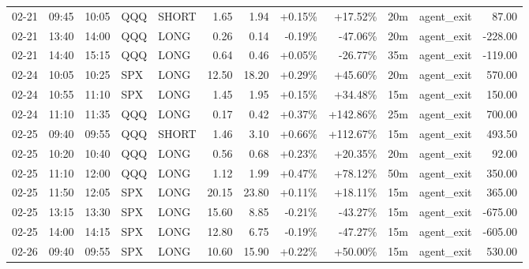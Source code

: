 \documentclass[11pt,a4paper]{article}
\begin{document}
\begin{center}
\begin{longtable}{>{\color{txtmain}}l l l l l r r r r r >{\color{txtmain}}l r}
02-21 & 09:45 & 10:05 & QQQ & SHORT & 1.65 & 1.94 & \textcolor{wingreen}{+0.15\%} & \textcolor{wingreen}{+17.52\%} & 20m & agent\_exit & \textcolor{wingreen}{87.00} \\
02-21 & 13:40 & 14:00 & QQQ & LONG & 0.26 & 0.14 & \textcolor{lossred}{-0.19\%} & \textcolor{lossred}{-47.06\%} & 20m & agent\_exit & \textcolor{lossred}{-228.00} \\
02-21 & 14:40 & 15:15 & QQQ & LONG & 0.64 & 0.46 & \textcolor{wingreen}{+0.05\%} & \textcolor{lossred}{-26.77\%} & 35m & agent\_exit & \textcolor{lossred}{-119.00} \\
02-24 & 10:05 & 10:25 & SPX & LONG & 12.50 & 18.20 & \textcolor{wingreen}{+0.29\%} & \textcolor{wingreen}{+45.60\%} & 20m & agent\_exit & \textcolor{wingreen}{570.00} \\
02-24 & 10:55 & 11:10 & SPX & LONG & 1.45 & 1.95 & \textcolor{wingreen}{+0.15\%} & \textcolor{wingreen}{+34.48\%} & 15m & agent\_exit & \textcolor{wingreen}{150.00} \\
02-24 & 11:10 & 11:35 & QQQ & LONG & 0.17 & 0.42 & \textcolor{wingreen}{+0.37\%} & \textcolor{wingreen}{+142.86\%} & 25m & agent\_exit & \textcolor{wingreen}{700.00} \\
02-25 & 09:40 & 09:55 & QQQ & SHORT & 1.46 & 3.10 & \textcolor{wingreen}{+0.66\%} & \textcolor{wingreen}{+112.67\%} & 15m & agent\_exit & \textcolor{wingreen}{493.50} \\
02-25 & 10:20 & 10:40 & QQQ & LONG & 0.56 & 0.68 & \textcolor{wingreen}{+0.23\%} & \textcolor{wingreen}{+20.35\%} & 20m & agent\_exit & \textcolor{wingreen}{92.00} \\
02-25 & 11:10 & 12:00 & QQQ & LONG & 1.12 & 1.99 & \textcolor{wingreen}{+0.47\%} & \textcolor{wingreen}{+78.12\%} & 50m & agent\_exit & \textcolor{wingreen}{350.00} \\
02-25 & 11:50 & 12:05 & SPX & LONG & 20.15 & 23.80 & \textcolor{wingreen}{+0.11\%} & \textcolor{wingreen}{+18.11\%} & 15m & agent\_exit & \textcolor{wingreen}{365.00} \\
02-25 & 13:15 & 13:30 & SPX & LONG & 15.60 & 8.85 & \textcolor{lossred}{-0.21\%} & \textcolor{lossred}{-43.27\%} & 15m & agent\_exit & \textcolor{lossred}{-675.00} \\
02-25 & 14:00 & 14:15 & SPX & LONG & 12.80 & 6.75 & \textcolor{lossred}{-0.19\%} & \textcolor{lossred}{-47.27\%} & 15m & agent\_exit & \textcolor{lossred}{-605.00} \\
02-26 & 09:40 & 09:55 & SPX & LONG & 10.60 & 15.90 & \textcolor{wingreen}{+0.22\%} & \textcolor{wingreen}{+50.00\%} & 15m & agent\_exit & \textcolor{wingreen}{530.00} \\

\end{longtable}
\end{center}
\end{document}

